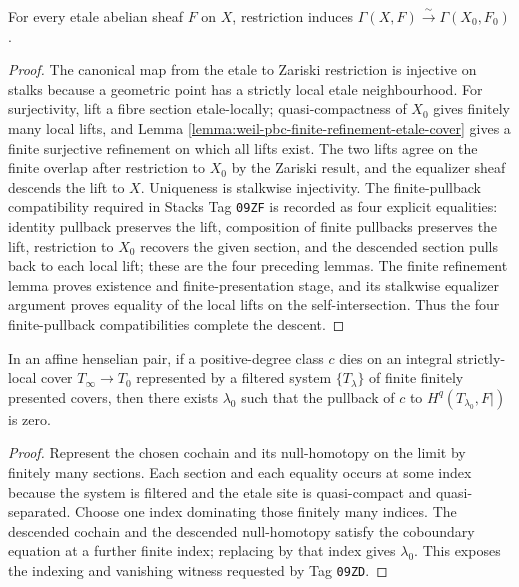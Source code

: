 \begin{lemma}
\label{lemma:weil-pbc-etale-degree-zero}
For every etale abelian sheaf $F$ on $X$, restriction induces
$\Gamma(X,F)\xrightarrow{\sim}\Gamma(X_0,F_0)$.
\end{lemma}
\begin{proof}

The canonical map from the etale to Zariski restriction is injective on
stalks because a geometric point has a strictly local etale neighbourhood.
For surjectivity, lift a fibre section etale-locally; quasi-compactness of
$X_0$ gives finitely many local lifts, and Lemma
\ref{lemma:weil-pbc-finite-refinement-etale-cover} gives a finite surjective
refinement on which all lifts exist.
The two lifts agree on the finite overlap after restriction to $X_0$ by the
Zariski result, and the equalizer sheaf descends the lift to $X$.  Uniqueness
is stalkwise injectivity.  The finite-pullback compatibility required in
Stacks Tag \texttt{09ZF} is recorded as four explicit equalities:
identity pullback preserves the lift, composition of finite pullbacks preserves
the lift, restriction to $X_0$ recovers the given section, and the descended
section pulls back to each local lift; these are the four preceding lemmas.
The finite refinement lemma proves existence and finite-presentation stage,
and its stalkwise equalizer argument proves equality of the local lifts on
the self-intersection.  Thus the four finite-pullback compatibilities
complete the descent.
\end{proof}

\begin{lemma}
\label{lemma:weil-pbc-finite-stage-killing}
\uses{}
In an affine henselian pair, if a positive-degree class $c$ dies on an
integral strictly-local cover $T_\infty\to T_0$ represented by a filtered
system $\{T_\lambda\}$ of finite finitely presented covers, then there exists
$\lambda_0$ such that the pullback of $c$ to $H^q(T_{\lambda_0},F|)$ is zero.
\end{lemma}
\begin{proof}
\uses{} 
Represent the chosen cochain and its null-homotopy on the limit by finitely
many sections.  Each section and each equality occurs at some index because
the system is filtered and the etale site is quasi-compact and quasi-separated.
Choose one index dominating those finitely many indices.  The descended
cochain and the descended null-homotopy satisfy the coboundary equation at a
further finite index; replacing by that index gives $\lambda_0$.  This exposes the indexing and
vanishing witness requested by Tag \texttt{09ZD}.
\end{proof}

